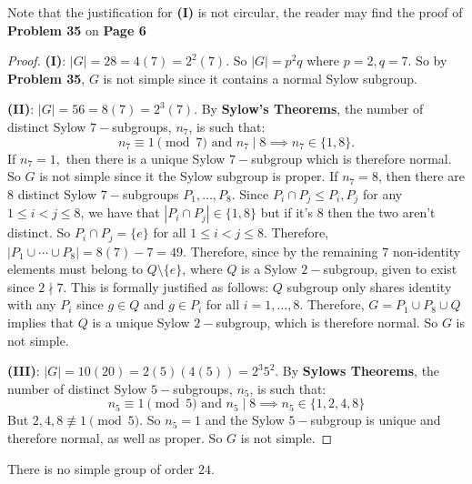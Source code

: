 \documentclass[addpoints,10pt]{exam}
\theoremstyle{plain}
\theoremstyle{definition}
\newtheorem{prob}[thm]{Problem}
\theoremstyle{plain}
\theoremstyle{plain}
\theoremstyle{definition}
\let\oldprob\prob
\let\endoldprob\endprob
\renewenvironment{prob}
  {\begin{singlespace}\oldprob}
  {\endoldprob\end{singlespace}}
\newcommand{\belowtitle}{\leavevmode\newline}
\begin{document}
Note that the justification for \textbf{(I)} is not circular, the reader may find the proof of \textbf{Problem 35} on \textbf{Page 6}
\begin{proof}\belowtitle
  \textbf{(I)}: $|G|=28=4(7)=2^{2}(7)$. So $|G|=p^{2}q$ where $p=2,q=7$. So by \textbf{Problem 35}, $G$ is not simple since it contains a normal Sylow subgroup.

  \textbf{(II)}: $|G|=56=8(7)=2^{3}(7)$. By \textbf{Sylow's Theorems}, the number of distinct Sylow $7-$subgroups, $n_{7}$, is such that:
  $$n_{7}\equiv 1\pmod{7}\text{ and } n_{7}\mid 8\implies n_{7}\in \{1,8\}.$$
  If $n_{7}=1,$ then there is a unique Sylow $7-$subgroup which is therefore normal. So $G$ is not simple since it the Sylow subgroup is proper. If $n_{7}=8$, then there are $8$ distinct Sylow $7-$subgroups $P_{1},\hdots,P_{8}$. Since $P_{i}\cap P_{j}\leq P_{i},P_{j}$ for any $1\leq i<j\leq 8$, we have that  $|P_{i}\cap P_{j}|\in \{1,8\}$ but if it's $8$ then the two aren't distinct. So $P_{i}\cap P_{j}=\{e\}$ for all $1\leq i<j\leq 8$. Therefore, $|P_{1}\cup \cdots \cup P_{8}|=8(7)-7=49.$ Therefore, since by the remaining $7$ non-identity elements must belong to $Q\setminus \{e\}$, where $Q$ is a Sylow $2-$subgroup, given to exist since $2\nmid 7$. This is formally justified as follows: $Q$ subgroup only shares identity with any $P_{i}$ since $g\in Q$ and $g\in P_{i}$ for all $i=1,\hdots,8$. Therefore, $G=P_{1}\cup P_{8}\cup Q$ implies that $Q$ is a unique Sylow $2-$subgroup, which is therefore normal. So $G$ is not simple.

  \textbf{(III)}: $|G|=10(20)=2(5)(4(5))=2^{3}5^{2}$. By \textbf{Sylows Theorems}, the number of distinct Sylow $5-$subgroups, $n_{5}$, is such that:
  $$n_{5}\equiv 1\pmod{5}\text{ and }n_{5}\mid 8\implies n_{5}\in \{1,2,4,8\}$$
  But $2,4,8\not\equiv 1\pmod{5}$. So $n_{5}=1$ and the Sylow $5-$subgroup is unique and therefore normal, as well as proper. So $G$ is not simple.

\end{proof}
\newpage
\setcounter{thm}{29}   %
\begin{prob}\belowtitle
There is no simple group of order $24$.
\end{prob}
\end{document}
